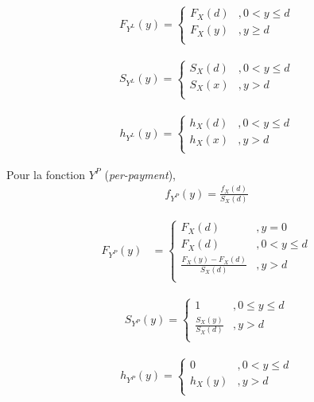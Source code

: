 \documentclass[12pt, french]{report}
\begin{document}
\begin{align*}
F_{Y^L}(y) = 
\begin{cases}
F_X(d)	& , 0 < y \leq d \\
F_X(y)	& , y \geq d \\
\end{cases}
\end{align*}

\begin{align*}
S_{Y^L}(y) = 
\begin{cases}
S_X(d)	& , 0 < y \leq d \\
S_X(x)	& , y > d \\
\end{cases}
\end{align*}

\begin{align*}
h_{Y^L}(y)	= 
\begin{cases}
h_X(d)	& , 0 < y \leq d \\
h_X(x)	& , y > d \\
\end{cases}
\end{align*}

Pour la fonction $Y^P$ (\textit{per-payment}),
\begin{align*}
f_{Y^P}(y) = \frac{f_X(d)}{S_X(d)}
\end{align*}

\begin{align*}
F_{Y^P}(y)	& = 
\begin{cases}
F_X(d)	& , y = 0 \\
F_X(d)	& , 0 < y \leq d \\
\frac{F_X(y) - F_X(d)}{S_X(d)}	& , y > d \\
\end{cases}
\end{align*}

\begin{align*}
S_{Y^P}(y) = 
\begin{cases}
1	& , 0 \leq y \leq d \\
\frac{S_X(y)}{S_X(d)}	& , y > d \\
\end{cases}
\end{align*}

\begin{align*}
h_{Y^P}(y) = 
\begin{cases}
0		& , 0 < y \leq d \\
h_X(y)	& , y > d \\
\end{cases}
\end{align*}
\end{document}
